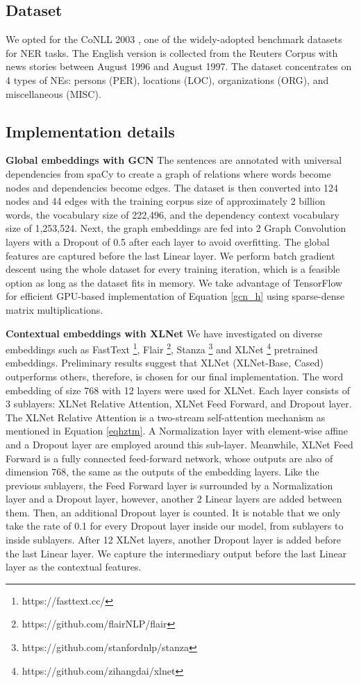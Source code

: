 \documentclass[runningheads]{llncs}
\begin{document}
\subsection{Dataset}
We opted for the CoNLL 2003 \cite{tjongkimsang2003conll}, one of the widely-adopted benchmark datasets for NER tasks. The English version is collected from the Reuters Corpus with news stories between August 1996 and August 1997. The dataset concentrates on 4 types of NEs: persons (PER), locations (LOC), organizations (ORG), and miscellaneous (MISC). \vspace{-0.3cm}
\subsection{Implementation details}
\noindent\textbf{Global embeddings with GCN}
The sentences are annotated with universal dependencies from spaCy to create a graph of relations where words become nodes and dependencies become edges. The dataset is then converted into 124 nodes and 44 edges with the training corpus size of approximately 2 billion words, the vocabulary size of 222,496, and the dependency context vocabulary size of 1,253,524. Next, the graph embeddings are fed into 2 Graph Convolution layers with a Dropout of 0.5 after each layer to avoid overfitting. The global features are captured before the last Linear layer. We perform batch gradient descent using the whole dataset for every training iteration, which is a feasible option as long as the dataset fits in memory. We take advantage of TensorFlow for efficient GPU-based implementation of Equation \ref{gcn_h} using sparse-dense matrix multiplications. 

\noindent\textbf{Contextual embeddings with XLNet}
We have investigated on diverse embeddings such as FastText \cite{mikolov2018advances} \footnote{https://fasttext.cc/}, Flair \cite{akbik2019flair} \footnote{https://github.com/flairNLP/flair}, Stanza \cite{qi2020stanza} \footnote{https://github.com/stanfordnlp/stanza} and XLNet \cite{yang2019xlnet} \footnote{https://github.com/zihangdai/xlnet} pretrained embeddings. Preliminary results suggest that XLNet (XLNet-Base, Cased) outperforms others, therefore, is chosen for our final implementation. The word embedding of size 768 with 12 layers were used for XLNet. Each layer consists of 3 sublayers: XLNet Relative Attention, XLNet Feed Forward, and Dropout layer. The XLNet Relative Attention is a two-stream self-attention mechanism as mentioned in Equation \ref{eqhztm}. A Normalization layer with element-wise affine and a Dropout layer are employed around this sub-layer. Meanwhile, XLNet Feed Forward is a fully connected feed-forward network, whose outputs are also of dimension 768, the same as the outputs of the embedding layers. Like the previous sublayers, the Feed Forward layer is surrounded by a Normalization layer and a Dropout layer, however, another 2 Linear layers are added between them. Then, an additional Dropout layer is counted. It is notable that we only take the rate of 0.1 for every Dropout layer inside our model, from sublayers to inside sublayers.  After 12 XLNet layers, another Dropout layer is added before the last Linear layer. We capture the intermediary output before the last Linear layer as the contextual features. 
\end{document}
